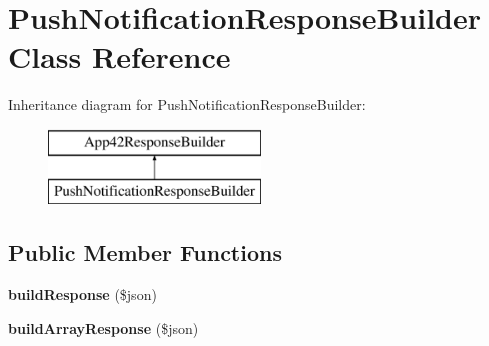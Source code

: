\hypertarget{class_push_notification_response_builder}{\section{Push\+Notification\+Response\+Builder Class Reference}
\label{class_push_notification_response_builder}
}
Inheritance diagram for Push\+Notification\+Response\+Builder\+:\begin{figure}[H]
\begin{center}
\leavevmode
\includegraphics[height=2.000000cm]{class_push_notification_response_builder}
\end{center}
\end{figure}
\subsection*{Public Member Functions}
\begin{DoxyCompactItemize}
\item 
\hypertarget{class_push_notification_response_builder_a8bc94acdaada04a52b74b8f9afb25c4c}{{\bfseries build\+Response} (\$json)}\label{class_push_notification_response_builder_a8bc94acdaada04a52b74b8f9afb25c4c}

\item 
\hypertarget{class_push_notification_response_builder_a901d0fc914904a6314c201378ce5f763}{{\bfseries build\+Array\+Response} (\$json)}\label{class_push_notification_response_builder_a901d0fc914904a6314c201378ce5f763}

\end{DoxyCompactItemize}
